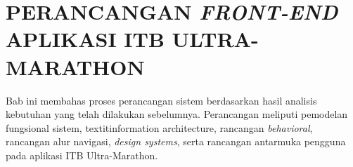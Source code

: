 \cleardoublepage
\chapter{PERANCANGAN \textit{FRONT-END} APLIKASI ITB ULTRA-MARATHON}
\label{chap:perancangan}
Bab ini membahas proses perancangan sistem berdasarkan hasil analisis kebutuhan yang telah dilakukan sebelumnya. Perancangan meliputi pemodelan fungsional sistem, textit{information architecture}, rancangan \textit{behavioral}, rancangan alur navigasi, \textit{design systems}, serta rancangan antarmuka pengguna pada aplikasi ITB Ultra-Marathon.


